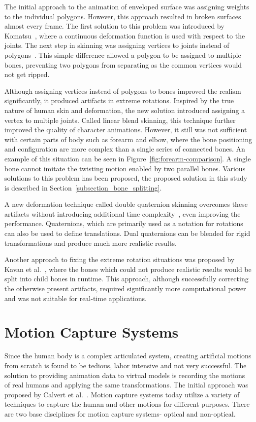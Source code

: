 The initial approach to the animation of enveloped surface was assigning weights to the individual polygons. However, this approach resulted in broken surfaces almost every frame. The first solution to this problem was introduced by Komatsu~\cite{Komatsu1988}, where a continuous deformation function is used with respect to the joints. The next step in skinning was assigning vertices to joints instead of polygons~\cite{Lander1988}. This simple difference allowed a polygon to be assigned to multiple bones, preventing two polygons from separating as the common vertices would not get ripped.

Although assigning vertices instead of polygons to bones improved the realism significantly, it produced artifacts in extreme rotations. Inspired by the true nature of human skin and deformation, the new solution introduced assigning a vertex to multiple joints. Called linear blend skinning, this technique further improved the quality of character animations. However, it still was not sufficient with certain parts of body such as forearm and elbow, where the bone positioning and configuration are more complex than a single series of connected bones. An example of this situation can be seen in Figure~\ref{fig:forearm-comparison}.
A single bone cannot imitate the twisting motion enabled by two parallel bones. Various solutions to this problem has been proposed, the proposed solution in this study is described in Section~\ref{subsection_bone_splitting}. 

A new deformation technique called double quaternion skinning overcomes these artifacts without introducing additional time complexity~\cite{Kavan2007}, even improving the performance. Quaternions, which are primarily used as a notation for rotations can also be used to define translations. Dual quaternions can be blended for rigid transformations and produce much more realistic results.

Another approach to fixing the extreme rotation situations was proposed by Kavan et al.~\cite{Kavan2009}, where the bones which could not produce realistic results would be split into child bones in runtime. This approach, although successfully correcting the otherwise present artifacts, required significantly more computational power and was not suitable for real-time applications. 


\section{Motion Capture Systems}
\label{section_related_mocap}
Since the human body is a complex articulated system, creating artificial motions from scratch is found to be tedious, labor intensive and not very successful. The solution to providing animation data to virtual models is recording the motions of real humans and applying the same transformations. The initial approach was proposed by Calvert et al.~\cite{Calvert1982}. Motion capture systems today utilize a variety of techniques to capture the human and other motions for different purposes. There are two base disciplines for motion capture systems- optical and non-optical.
 
